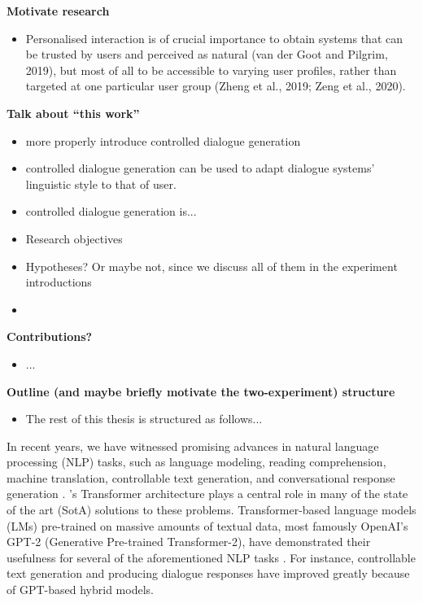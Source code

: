 \textbf{Motivate research}
\begin{itemize}
    \item Personalised interaction is of crucial importance to obtain systems that can be trusted by users and perceived as natural (van der Goot and Pilgrim, 2019), but most of all to be accessible to varying user profiles, rather than targeted at one particular user group (Zheng et al., 2019; Zeng et al., 2020).
\end{itemize}

\textbf{Talk about ``this work''}
\begin{itemize}
    \item more properly introduce controlled dialogue generation
    \item controlled dialogue generation can be used to adapt dialogue systems' linguistic style to that of user.
    \item controlled dialogue generation is...
    \item Research objectives
    \item Hypotheses? Or maybe not, since we discuss all of them in the experiment introductions
    \item 
\end{itemize}

\textbf{Contributions?}
\begin{itemize}
    \item ...
\end{itemize}

\textbf{Outline (and maybe briefly motivate the two-experiment) structure}
\begin{itemize}
    \item The rest of this thesis is structured as follows...
\end{itemize}

In recent years, we have witnessed promising advances in natural language processing (NLP) tasks, such as language modeling, reading comprehension, machine translation, controllable text generation, and conversational response generation \citep{radford2019language, DBLP:journals/corr/BahdanauCB14, dathathri2019plug, madotto-etal-2020-plug}. \cite{vaswani2017attention}'s Transformer architecture plays a central role in many of the state of the art (SotA) solutions to these problems. Transformer-based language models (LMs) pre-trained on massive amounts of textual data, most famously OpenAI's GPT-2 (Generative Pre-trained Transformer-2), have demonstrated their usefulness for several of the aforementioned NLP tasks \citep{radford2019language}. For instance, controllable text generation and producing dialogue responses have improved greatly because of GPT-based hybrid models. %

